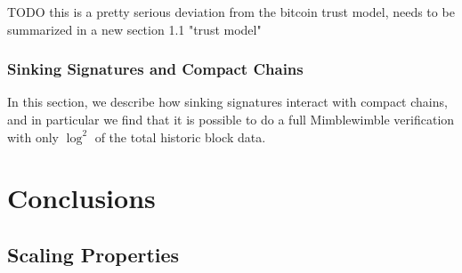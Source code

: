 \documentclass[letterpaper]{article}
\begin{document}
TODO this is a pretty serious deviation from the bitcoin trust model, needs
to be summarized in a new section 1.1 "trust model"

\subsubsection{Sinking Signatures and Compact Chains\label{ss_cc}}

In this section, we describe how sinking signatures interact with compact
chains, and in particular we find that it is possible to do a full
Mimblewimble verification with only $\log^2$ of the total historic block
data.

\section{Conclusions}
\subsection{Scaling Properties}

\nolinenumbers

\clearpage


\end{document}
